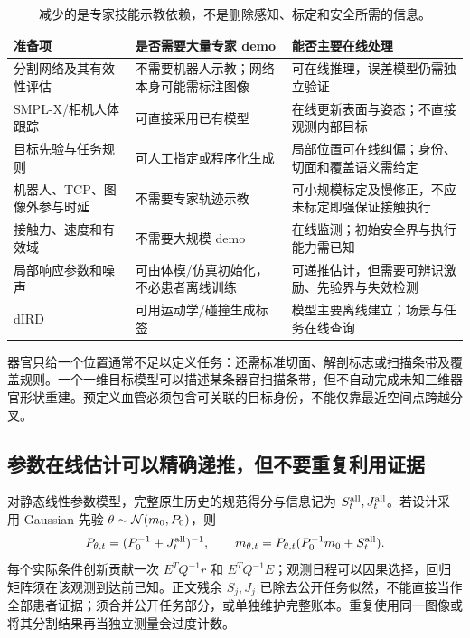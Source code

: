 \documentclass[UTF8,fontset=fandol,11pt,a4paper]{ctexart}
\theoremstyle{definition}\newtheorem{definition}[theorem]{定义}\newtheorem{assumption}[theorem]{条件}
\numberwithin{equation}{section}
\begin{document}
\begin{table}[ht]\centering\small
\begin{tabularx}{\linewidth}{p{.27\linewidth}p{.22\linewidth}Y}
\toprule
准备项 & 是否需要大量专家 demo & 能否主要在线处理\\\midrule
分割网络及其有效性评估 & 不需要机器人示教；网络本身可能需标注图像 & 可在线推理，误差模型仍需独立验证\\
SMPL-X/相机人体跟踪 & 可直接采用已有模型 & 在线更新表面与姿态；不直接观测内部目标\\
目标先验与任务规则 & 可人工指定或程序化生成 & 局部位置可在线纠偏；身份、切面和覆盖语义需给定\\
机器人、TCP、图像外参与时延 & 不需要专家轨迹示教 & 可小规模标定及慢修正，不应未标定即强保证接触执行\\
接触力、速度和有效域 & 不需要大规模 demo & 在线监测；初始安全界与执行能力需已知\\
局部响应参数和噪声 & 可由体模/仿真初始化，不必患者离线训练 & 可递推估计，但需要可辨识激励、先验界与失效检测\\
dIRD & 可用运动学/碰撞生成标签 & 模型主要离线建立；场景与任务在线查询\\
\bottomrule
\end{tabularx}
\caption{减少的是专家技能示教依赖，不是删除感知、标定和安全所需的信息。}
\end{table}

器官只给一个位置通常不足以定义任务：还需标准切面、解剖标志或扫描条带及覆盖规则。一个一维目标模型可以描述某条器官扫描条带，但不自动完成未知三维器官形状重建。预定义血管必须包含可关联的目标身份，不能仅靠最近空间点跨越分叉。

\subsection{参数在线估计可以精确递推，但不要重复利用证据}
对静态线性参数模型，完整原生历史的规范得分与信息记为 $S_t^{\rm all},J_t^{\rm all}$。若设计采用 Gaussian 先验 $\theta\sim\mathcal N(m_0,P_0)$，则
\begin{equation}
P_{\theta,t}=(P_0^{-1}+J_t^{\rm all})^{-1},\qquad
m_{\theta,t}=P_{\theta,t}(P_0^{-1}m_0+S_t^{\rm all}).
\label{eq:onlineposterior}
\end{equation}
每个实际条件创新贡献一次 $E^TQ^{-1}r$ 和 $E^TQ^{-1}E$；观测日程可以因果选择，回归矩阵须在该观测到达前已知。正文残余 $S_j,J_j$ 已除去公开任务似然，不能直接当作全部患者证据；须合并公开任务部分，或单独维护完整账本。重复使用同一图像或将其分割结果再当独立测量会过度计数。
\end{document}
